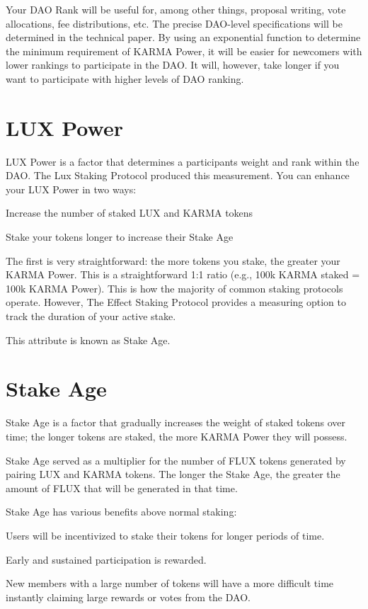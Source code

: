 \documentclass[11pt]{article}
\begin{document}
Your DAO Rank will be useful for, among other things, proposal writing, vote allocations, fee distributions, etc. The precise DAO-level specifications will be determined in the technical paper. By using an exponential function to determine the minimum requirement of KARMA Power, it will be easier for newcomers with lower rankings to participate in the DAO. It will, however, take longer if you want to participate with higher levels of DAO ranking.


\section{LUX Power}

LUX Power is a factor that determines a participants weight and rank within the DAO. The Lux Staking Protocol produced this measurement. You can enhance your LUX Power in two ways:


Increase the number of staked LUX and KARMA tokens


Stake your tokens longer to increase their Stake Age


The first is very straightforward: the more tokens you stake, the greater your KARMA Power. This is a straightforward 1:1 ratio (e.g., 100k KARMA staked = 100k KARMA Power). This is how the majority of common staking protocols operate. However, The Effect Staking Protocol provides a measuring option to track the duration of your active stake.


This attribute is known as Stake Age.


\section{Stake Age}

Stake Age is a factor that gradually increases the weight of staked tokens over time; the longer tokens are staked, the more KARMA Power they will possess.


Stake Age served as a multiplier for the number of FLUX tokens generated by pairing LUX and KARMA tokens. The longer the Stake Age, the greater the amount of FLUX that will be generated in that time.


Stake Age has various benefits above normal staking:


Users will be incentivized to stake their tokens for longer periods of time.


Early and sustained participation is rewarded.


New members with a large number of tokens will have a more difficult time instantly claiming large rewards or votes from the DAO.
\end{document}
